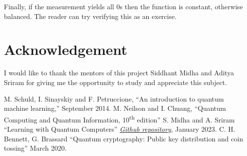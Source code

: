 \documentclass[conference]{IEEEtran}
\begin{document}
Finally, if the measurement yields all 0s then the function is constant, otherwise balanced. The reader can try verifying this as an exercise.

\section*{Acknowledgement}

I would like to thank the mentors of this project Siddhant Midha and Aditya Sriram for giving 
me the opportunity to study and appreciate this subject. 

\begin{thebibliography}{00}
 M. Schuld, I. Sinayskiy and F. Petruccione, ``An introduction to quantum machine learning,'' September 2014.
 M. Neilson and I. Chuang, ``Quantum Computing and Quantum Information, 10\textsuperscript{th} edition''
 S. Midha and A. Sriram ``Learning with Quantum Computers'' \href{https://github.com/siddhant-midha/WiDS-22-Learning-with-quantum-computers-}{\textit{Github repository}}, January 2023.
 C. H. Bennett, G. Brassard ``Quantum cryptography: Public key distribution and coin tossing'' March 2020.
\end{thebibliography}
\vspace{12pt}
\end{document}

